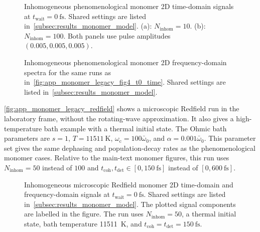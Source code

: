 \begin{figure}[htbp]
    \centering
    \caption{Inhomogeneous phenomenological monomer 2D time-domain signals at
    \(t_{\mathrm{wait}}=\SI{0}{\femto\second}\). Shared settings are listed
    in~\autoref{subsec:results_monomer_model}. (a):
    \(N_{\mathrm{inhom}}=10\). (b): \(N_{\mathrm{inhom}}=100\). Both panels
    use pulse amplitudes \((0.005,0.005,0.005)\).}
    \label{fig:app_monomer_legacy_fig4_t0_time}
\end{figure}

\begin{figure}[htbp]
    \centering
    \caption{Inhomogeneous phenomenological monomer 2D frequency-domain spectra for
    the same runs as in~\autoref{fig:app_monomer_legacy_fig4_t0_time}. Shared
    settings are listed in~\autoref{subsec:results_monomer_model}.}
    \label{fig:app_monomer_legacy_fig4_t0_freq}
\end{figure}


\autoref{fig:app_monomer_legacy_redfield} shows a microscopic Redfield run in the
laboratory frame, without the rotating-wave approximation. It also gives a
high-temperature bath example with a thermal initial state. The Ohmic bath
parameters are \(s=1\), \(T=\SI{11511}{\kelvin}\),
\(\omega_{\mathrm{c}}=100\bar{\omega}_0\), and
\(\alpha=0.001\bar{\omega}_0\). This parameter set gives
the same dephasing and population-decay rates as the phenomenological monomer
cases. Relative to the main-text monomer figures, this run uses
\(N_{\mathrm{inhom}}=50\) instead of \(100\) and \(t_{\mathrm{coh}},t_{\mathrm{det}}\in
[0,\SI{150}{\femto\second}]\) instead of
\([0,\SI{600}{\femto\second}]\).


\begin{figure}[htbp]
    \centering
    \caption{Inhomogeneous microscopic Redfield monomer 2D time-domain and
    frequency-domain signals at $t_{\mathrm{wait}}=\SI{0}{\femto\second}$.
    Shared settings are listed in~\autoref{subsec:results_monomer_model}. The
    plotted signal components are labelled in the figure. The run uses
    \(N_{\mathrm{inhom}}=50\), a thermal initial state, bath temperature
    \SI{11511}{\kelvin}, and
    \(t_{\mathrm{coh}}=t_{\mathrm{det}}=\SI{150}{\femto\second}\).}
    \label{fig:app_monomer_legacy_redfield}
\end{figure}

